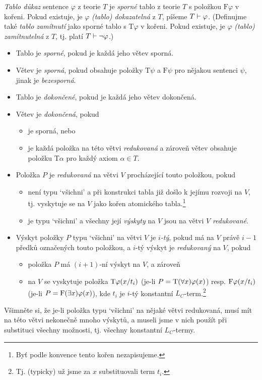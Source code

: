 \begin{definition}
    \emph{Tablo důkaz} sentence $\varphi$ z teorie $T$ je \emph{sporné} tablo z teorie $T$ s položkou $\mathrm{F}\varphi$ v kořeni. Pokud existuje, je $\varphi$ \emph{(tablo) dokazatelná} z $T$, píšeme $T\vdash\varphi$. (Definujme také \emph{tablo zamítnutí} jako sporné tablo s $\mathrm{T}\varphi$ v kořeni. Pokud existuje, je $\varphi$ \emph{(tablo) zamítnutelná} z $T$, tj. platí $T\vdash\neg\varphi$.)  
    \begin{itemize}
        \item Tablo je \emph{sporné}, pokud je každá jeho větev sporná.
        \item Větev je \emph{sporná}, pokud obsahuje položky $\mathrm{T}\psi$ a $\mathrm{F}\psi$ pro nějakou sentenci $\psi$, jinak je \emph{bezesporná}.
        \item Tablo je \emph{dokončené}, pokud je každá jeho větev dokončená.
        \item Větev je \emph{dokončená}, pokud 
        \begin{itemize}
            \item je sporná, nebo
            \item je každá položka na této větvi \emph{redukovaná} a zároveň větev obsahuje položku $\mathrm{T}\alpha$ pro každý axiom $\alpha\in T$.
        \end{itemize}
         
        \item Položka $P$ je \emph{redukovaná} na větvi $V$ procházející touto položkou, pokud 
        \begin{itemize}
            \item není typu `všichni' a při konstrukci tabla již došlo k jejímu rozvoji na $V$, tj. vyskytuje se na $V$ jako kořen atomického tabla.\footnote{Byť podle konvence tento kořen nezapisujeme.}
            \item je typu `všichni' a všechny její \emph{výskyty} na $V$ jsou na větvi $V$ \emph{redukované}.
        \end{itemize}
        \item Výskyt položky $P$ typu `všichni' na větvi $V$ je \emph{$i$-tý}, pokud má na $V$ právě $i-1$ předků označených touto položkou, a $i$-tý výskyt je \emph{redukovaný} na $V$, pokud
        \begin{itemize}
            \item položka $P$ má $(i+1)$-ní výskyt na $V$, a zároveň
            \item na $V$ se vyskytuje položka $\mathrm{T}\varphi(x/t_i)$ (je-li $P=\mathrm{T}(\forall x)\varphi(x)$) resp. $\mathrm{F}\varphi(x/t_i)$ (je-li $P=\mathrm{F}(\exists x)\varphi(x)$), kde $t_i$ je $i$-tý konstantní $L_C$-term.\footnote{Tj. (typicky) už jsme za $x$ substituovali term $t_i$.}
        \end{itemize} 
    \end{itemize}
\end{definition}
Všimněte si, že je-li položka typu `všichni' na nějaké větvi redukovaná, musí mít na této větvi nekonečně mnoho výskytů, a museli jsme v nich použít při substituci všechny možnosti, tj. všechny konstantní $L_C$-termy.
    
